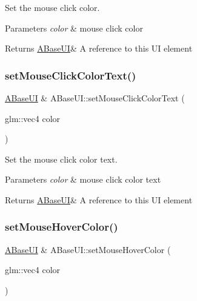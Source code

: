 Set the mouse click color. 


\begin{DoxyParams}{Parameters}
{\em color} & mouse click color \\
\hline
\end{DoxyParams}
\begin{DoxyReturn}{Returns}
\hyperlink{class_a_base_u_i}{A\+Base\+UI}\& A reference to this UI element 
\end{DoxyReturn}
\mbox{\label{class_a_base_u_i_a0afbe90ac3012028bd9895cdfe0d7861}} 
\subsubsection{\texorpdfstring{set\+Mouse\+Click\+Color\+Text()}{setMouseClickColorText()}}
{\footnotesize\ttfamily \hyperlink{class_a_base_u_i}{A\+Base\+UI} \& A\+Base\+U\+I\+::set\+Mouse\+Click\+Color\+Text (\begin{DoxyParamCaption}\item[{glm\+::vec4}]{color }\end{DoxyParamCaption})\hspace{0.3cm}{\ttfamily [virtual]}}



Set the mouse click color text. 


\begin{DoxyParams}{Parameters}
{\em color} & mouse click color text \\
\hline
\end{DoxyParams}
\begin{DoxyReturn}{Returns}
\hyperlink{class_a_base_u_i}{A\+Base\+UI}\& A reference to this UI element 
\end{DoxyReturn}
\mbox{\label{class_a_base_u_i_a902c194cc52e03a49f52c74bdbe61deb}} 
\subsubsection{\texorpdfstring{set\+Mouse\+Hover\+Color()}{setMouseHoverColor()}}
{\footnotesize\ttfamily \hyperlink{class_a_base_u_i}{A\+Base\+UI} \& A\+Base\+U\+I\+::set\+Mouse\+Hover\+Color (\begin{DoxyParamCaption}\item[{glm\+::vec4}]{color }\end{DoxyParamCaption})\hspace{0.3cm}{\ttfamily [virtual]}}




